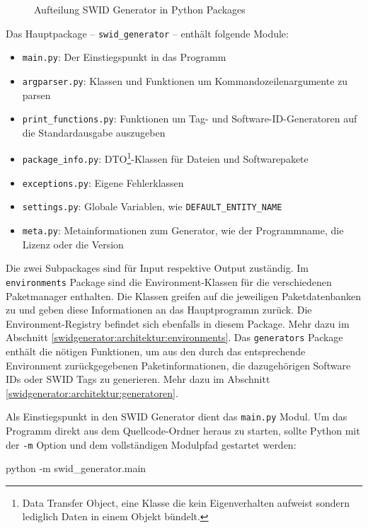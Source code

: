 \begin{figure}[H]
	\centering
	
	\caption{Aufteilung SWID Generator in Python Packages}
\end{figure}

Das Hauptpackage -- \texttt{swid\_generator} -- enthält folgende Module:

\begin{itemize}
	\item \texttt{main.py}: Der Einstiegspunkt in das Programm
	\item \texttt{argparser.py}: Klassen und Funktionen um
		Kommandozeilenargumente zu parsen
	\item \texttt{print\_functions.py}: Funktionen um Tag- und
		Software-ID-Generatoren auf die Standardausgabe auszugeben
	\item \texttt{package\_info.py}: DTO\footnote{Data Transfer Object, eine
		Klasse die kein Eigenverhalten aufweist sondern lediglich Daten in
		einem Objekt bündelt.}-Klassen für Dateien und Softwarepakete
	\item \texttt{exceptions.py}: Eigene Fehlerklassen
	\item \texttt{settings.py}: Globale Variablen, wie \zb
		\texttt{DEFAULT\_ENTITY\_NAME}
	\item \texttt{meta.py}: Metainformationen zum Generator, wie \zb der
		Programmname, die Lizenz oder die Version
\end{itemize}

Die zwei Subpackages sind für Input respektive Output zuständig. Im
\texttt{environments} Package sind die Environment-Klassen für die verschiedenen
Paketmanager enthalten. Die Klassen greifen auf die jeweiligen Paketdatenbanken
zu und geben diese Informationen an das Hauptprogramm zurück. Die
Environment-Registry befindet sich ebenfalls in diesem Package. Mehr dazu im
Abschnitt \ref{swidgenerator:architektur:environments}. Das \texttt{generators}
Package enthält die nötigen Funktionen, um aus den durch das entsprechende
Environment zurückgegebenen Paketinformationen, die dazugehörigen Software IDs
oder SWID Tags zu generieren. Mehr dazu im Abschnitt
\ref{swidgenerator:architektur:generatoren}.

Als Einstiegspunkt in den SWID Generator dient das \texttt{main.py} Modul. Um
das Programm direkt aus dem Quellcode-Ordner heraus zu starten, sollte Python
mit der \texttt{-m} Option und dem vollständigen Modulpfad gestartet werden:

\begin{bashcode}
python -m swid_generator.main
\end{bashcode}

